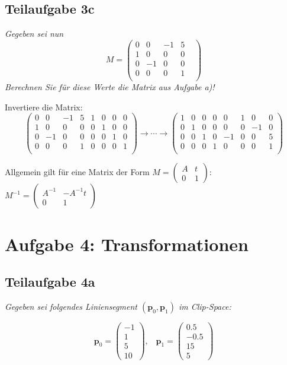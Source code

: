 \documentclass[a4paper]{scrartcl}
\begin{document}
\subsection*{Teilaufgabe 3c}
\textit{Gegeben sei nun}
$$M=\begin{pmatrix}0&0 &-1&5&\\
1&0 &0&0\\
0&-1&0 &0\\
0&0 &0 &1\\
\end{pmatrix}$$
\textit{Berechnen Sie für diese Werte die Matrix aus Aufgabe a)!}

Invertiere die Matrix: $$\left(\begin{array}{cccc|cccc}
0&0 &-1&5&1&0&0&0\\
1&0 &0&0&0&1&0&0\\
0&-1&0 &0&0&0&1&0\\
0&0 &0 &1&0&0&0&1\\
\end{array}\right)\longrightarrow\cdots\longrightarrow\left(\begin{array}{cccc|cccc}
1&0 &0&0&0&1&0&0\\
0&1&0 &0&0&0&-1&0\\
0&0 &1&0&-1&0&0&5\\
0&0 &0 &1&0&0&0&1\\
\end{array}\right)$$

Allgemein gilt für eine Matrix der Form $M = \begin{pmatrix}
A&t\\0&1\end{pmatrix}$: $M^{-1} = \begin{pmatrix}
A^{-1}&-A^{-1}t\\0&1
\end{pmatrix}$

\clearpage
\section*{Aufgabe 4: Transformationen}
\subsection*{Teilaufgabe 4a}
\textit{Gegeben sei folgendes Liniensegment $(\mathbf{p}_0 , \mathbf{p}_1)$ im
Clip-Space:}

\[\mathbf{p}_0 = \begin{pmatrix}-1\\1\\5\\10\end{pmatrix},\;\;\;
  \mathbf{p}_1 = \begin{pmatrix}0.5\\-0.5\\15\\5\end{pmatrix}\]
\end{document}
